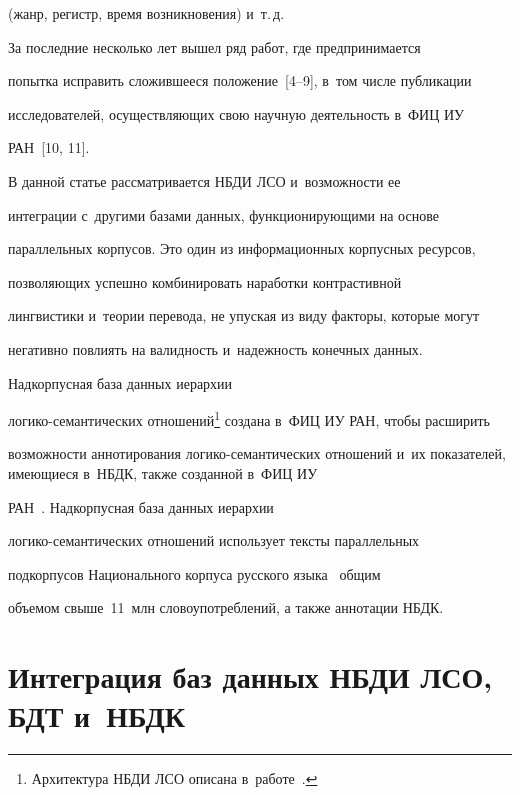 (жанр, регистр, время возникновения) и~т.\,д.


  


  За последние несколько лет вышел ряд работ, где предпринимается 


попытка исправить сложившееся положение~[4--9], в~том числе публикации 


исследователей, осуществляющих свою научную деятельность в~ФИЦ ИУ 


РАН~[10, 11].


  


  В данной статье рассматривается НБДИ ЛСО и~возможности ее 


интеграции с~другими базами данных, функционирующими на основе 


параллельных корпусов. Это один из информационных корпусных ресурсов, 


позволяющих успешно комбинировать наработки контрастивной 


лингвистики и~теории перевода, не упуская из виду факторы, которые могут 


негативно повлиять на валидность и~надежность конечных данных.


  


Надкорпусная база данных иерархии  


ло\-ги\-ко-се\-ман\-ти\-че\-ских отношений\footnote{Архитектура НБДИ ЛСО описана в~работе~\cite{14-dur}.} создана в~ФИЦ ИУ РАН, чтобы расширить 


возможности аннотирования ло\-ги\-ко-се\-ман\-ти\-че\-ских отношений и~их показателей, имеющиеся в~НБДК, также созданной в~ФИЦ ИУ  


РАН~\cite{12-dur}. Надкорпусная база данных иерархии  


ло\-ги\-ко-се\-ман\-ти\-че\-ских отношений использует тексты параллельных 


подкорпусов Национального корпуса русского языка~\cite{13-dur} общим 


объемом свыше~11~млн словоупотреблений, а также аннотации НБДК.


  


  \section{Интеграция баз данных НБДИ ЛСО, БДТ и~НБДК}


